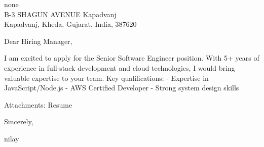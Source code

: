 \documentclass[11pt,a4paper]{letter}
\begin{document}
\begin{letter}{
none\\
B-3 SHAGUN AVENUE Kapadvanj\\
Kapadvanj, Kheda, Gujarat, India, 387620
}

\address{
nilay\\
B-3 SHAGUN AVENUE Kapadvanj\\
Kapadvanj, Kheda, Gujarat, India, 387620\\
9016989674\\
\href{mailto:nilaypatel@gmail.com}{nilaypatel@gmail.com}
}

\date{12/11/2024}

\opening{Dear Hiring Manager,}

I am excited to apply for the Senior Software Engineer position. With 5+ years of experience in full-stack development and cloud technologies, I would bring valuable expertise to your team. Key qualifications: - Expertise in JavaScript/Node.js - AWS Certified Developer - Strong system design skills

\vspace{\baselineskip}
\noindent Attachments: Resume

\closing{Sincerely,}

\vspace{0.5in}
nilay

\end{letter}
\end{document}

